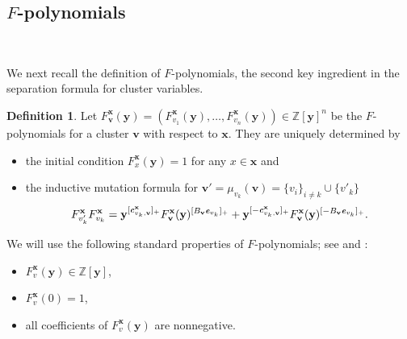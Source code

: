 \documentclass[11pt,reqno]{amsart}
\theoremstyle{plain}
\theoremstyle{definition}
\newtheorem{definition}[theorem]{Definition}
\numberwithin{equation}{section}
\newcommand\ZZ{\mathbb{Z}}
\newcommand\<{\langle}
\renewcommand\>{\rangle}
\def\vv{\mathbf{v}}
\newcommand{\bfit}[1]{\textbf{\textit{#1}}}
\def\xx{\mathbf{x}}%
\def\yy{\mathbf{y}}%
\def\cvec{\bfit{c}}
\def\Fpoly{{F}}
\begin{document}
\subsection{$F$-polynomials}\label{sec:F-poly}\

We next recall the definition of $F$-polynomials, the second key ingredient in the separation formula for cluster variables.

\begin{definition}\label{def:Fpoly}
Let $\Fpoly^\xx_{\vv}(\yy)=(\Fpoly^\xx_{v_1}(\yy),\ldots,\Fpoly^\xx_{v_n}(\yy))\in\ZZ[\yy]^{n}$ be the $F$-polynomials for a cluster $\vv$ with respect to $\xx$.
They are uniquely determined by
\begin{itemize}
  \item the initial condition $\Fpoly^\xx_x(\yy)=1$ for any $x\in\xx$ and
  \item the inductive mutation formula for $\vv'=\mu_{v_k}(\vv)=\{v_i\}_{i\ne k}\cup\{v'_k\}$
    \begin{gather}\label{eq:mutF}
        \Fpoly^\xx_{v'_k}\Fpoly^\xx_{v_k}=
        \yy^{[\cvec^{\xx}_{v_k,\vv}]_+} \Fpoly^{\xx}_{\vv}(\yy)^{[B_{\vv}\bfit{e}_{v_k}]_+} +
        \yy^{[-\cvec^{\xx}_{v_k,\vv}]_+} \Fpoly^{\xx}_{\vv}(\yy)^{[-B_{\vv}\bfit{e}_{v_k}]_+}.
    \end{gather}
\end{itemize}
\end{definition}

We will use the following standard properties of $F$-polynomials; see \cite[Props.~3.6 and~5.2]{FZ07} and \cite[Cor.~0.4]{GHKK18}:
\begin{itemize}
    \item $\Fpoly^\xx_v(\yy)\in\ZZ[\yy]$,
    \item $\Fpoly^\xx_v(0)=1$,
    \item all coefficients of $\Fpoly^\xx_v(\yy)$ are nonnegative.
\end{itemize}
\end{document}

